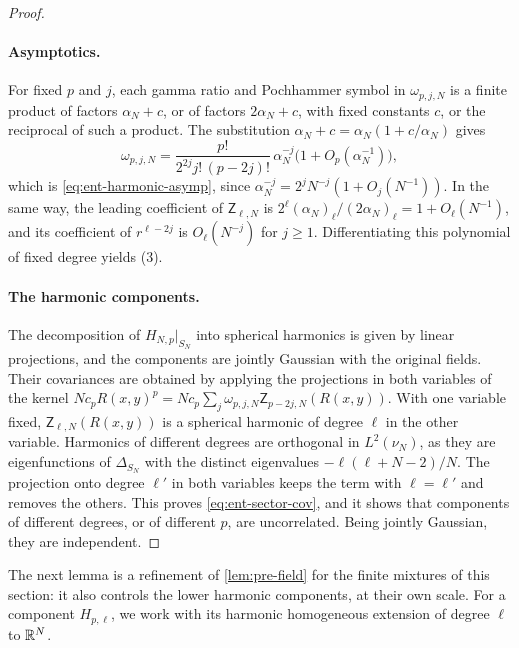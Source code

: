 \begin{proof}
\paragraph{Asymptotics.}
For fixed $p$ and $j$, each gamma ratio and Pochhammer symbol in
$\omega_{p,j,N}$ is a finite product of factors $\alpha_N+c$, or of factors
$2\alpha_N+c$, with fixed constants $c$, or the reciprocal of such a
product. The substitution $\alpha_N+c=\alpha_N(1+c/\alpha_N)$ gives
\[
 \omega_{p,j,N}=\frac{p!}{2^{2j}j!\,(p-2j)!}\,\alpha_N^{-j}
 \bigl(1+O_p(\alpha_N^{-1})\bigr),
\]
which is \eqref{eq:ent-harmonic-asymp}, since $\alpha_N^{-j}=2^jN^{-j}
(1+O_j(N^{-1}))$. In the same way, the leading coefficient of
$\mathsf Z_{\ell,N}$ is $2^\ell(\alpha_N)_\ell/(2\alpha_N)_\ell=1+O_\ell
(N^{-1})$, and its coefficient of $r^{\ell-2j}$ is $O_\ell(N^{-j})$ for
$j\ge1$. Differentiating this polynomial of fixed degree yields (3).

\paragraph{The harmonic components.}
The decomposition of $H_{N,p}|_{S_N}$ into spherical harmonics is given by
linear projections, and the components are jointly Gaussian with the
original fields. Their covariances are obtained by applying the projections
in both variables of the kernel $Nc_pR(x,y)^p
=Nc_p\sum_j\omega_{p,j,N}\mathsf Z_{p-2j,N}(R(x,y))$. With one variable
fixed, $\mathsf Z_{\ell,N}(R(x,y))$ is a spherical harmonic of degree $\ell$
in the other variable. Harmonics of different degrees are orthogonal in
$L^2(\nu_N)$, as they are eigenfunctions of $\Delta_{S_N}$ with the distinct
eigenvalues $-\ell(\ell+N-2)/N$. The projection onto degree $\ell'$ in both
variables keeps the term with $\ell=\ell'$ and removes the others. This
proves \eqref{eq:ent-sector-cov}, and it shows that components of different
degrees, or of different $p$, are uncorrelated. Being jointly Gaussian, they
are independent.
\end{proof}

The next lemma is a refinement of \cref{lem:pre-field} for the finite
mixtures of this section: it also controls the lower harmonic components, at
their own scale. For a component $H_{p,\ell}$, we work with its harmonic
homogeneous extension of degree $\ell$ to $\mathbb R^N$.

